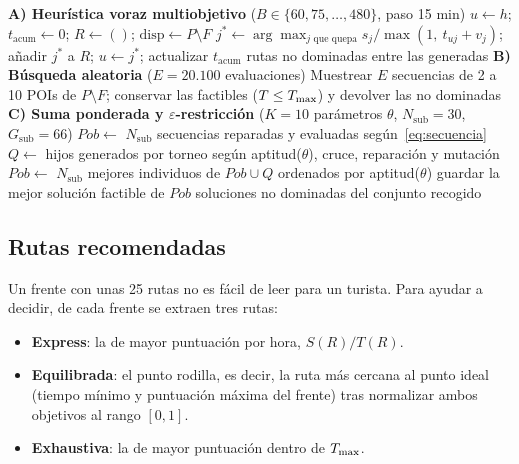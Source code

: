 \begin{algorithm}[tbp]
\caption{Líneas base: heurística voraz, búsqueda aleatoria y escalarización GA}
\label{alg:baselines}
\small
\begin{algorithmic}[1]
\Statex \textbf{A) Heurística voraz multiobjetivo} ($B \in \{60, 75, \dots, 480\}$, paso 15 min)
  \State $u \gets h$;\; $t_{\mathrm{acum}} \gets 0$;\; $R \gets ()$;\; $\mathrm{disp} \gets P \setminus F$
    \State $j^* \gets \arg\max_{j \text{ que quepa}} s_j / \max(1,\ t_{uj} + v_j)$;\; añadir $j^*$ a $R$;\; $u \gets j^*$;\; actualizar $t_{\mathrm{acum}}$
  \EndWhile
\EndFor
\State \Return rutas no dominadas entre las generadas
\medskip
\Statex \textbf{B) Búsqueda aleatoria} ($E = 20.100$ evaluaciones)
\State Muestrear $E$ secuencias de 2 a 10 POIs de $P \setminus F$; conservar las factibles ($T \le T_{\max}$) y devolver las no dominadas
\medskip
\Statex \textbf{C) Suma ponderada y $\varepsilon$-restricción} ($K = 10$ parámetros $\theta$, $N_{\mathrm{sub}} = 30$, $G_{\mathrm{sub}} = 66$)
  \State $\mathit{Pob} \gets$ $N_{\mathrm{sub}}$ secuencias reparadas y evaluadas según~\eqref{eq:secuencia}
    \State $Q \gets$ hijos generados por torneo según aptitud($\theta$), cruce, reparación y mutación
    \State $\mathit{Pob} \gets$ $N_{\mathrm{sub}}$ mejores individuos de $\mathit{Pob} \cup Q$ ordenados por aptitud($\theta$)
  \EndFor
  \State guardar la mejor solución factible de $\mathit{Pob}$
\EndFor
\State \Return soluciones no dominadas del conjunto recogido
\end{algorithmic}
\end{algorithm}

\subsection{Rutas recomendadas}
\label{sec:recomendadas}

Un frente con unas 25 rutas no es fácil de leer para un turista. Para ayudar a decidir, de cada frente se extraen tres rutas:
\begin{itemize}
  \item \textbf{Express}: la de mayor puntuación por hora, $S(R)/T(R)$.
  \item \textbf{Equilibrada}: el punto rodilla, es decir, la ruta más cercana al punto ideal (tiempo mínimo y puntuación máxima del frente) tras normalizar ambos objetivos al rango $[0,1]$.
  \item \textbf{Exhaustiva}: la de mayor puntuación dentro de $T_{\max}$.
\end{itemize}
